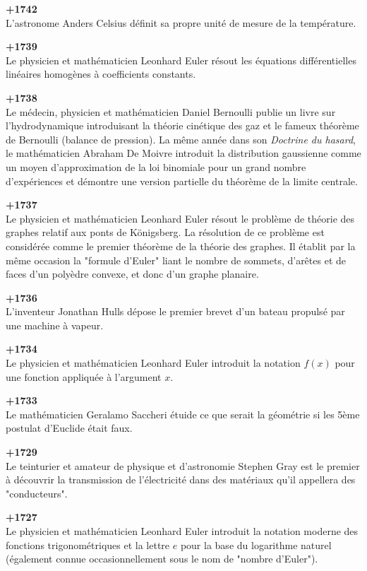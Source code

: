 \textbf{+1742}\\
L'astronome Anders Celsius définit sa propre unité de mesure de la température.

\textbf{+1739}\\
Le physicien et mathématicien Leonhard Euler résout les équations différentielles linéaires homogènes à coefficients constants.

\textbf{+1738}\\
Le médecin, physicien et mathématicien Daniel Bernoulli publie un livre sur l'hydrodynamique introduisant la théorie cinétique des gaz et le fameux théorème de Bernoulli (balance de pression). La même année dans son \textit{Doctrine du hasard}, le mathématicien Abraham De Moivre introduit la distribution gaussienne comme un moyen d'approximation de la loi binomiale pour un grand nombre d'expériences et démontre une version partielle du théorème de la limite centrale.

\textbf{+1737}\\
Le physicien et mathématicien Leonhard Euler résout le problème de théorie des graphes relatif aux ponts de Königsberg. La résolution de ce problème est considérée comme le premier théorème de la théorie des graphes. Il établit par la même occasion la "formule d'Euler" liant le nombre de sommets, d'arêtes et de faces d'un polyèdre convexe, et donc d'un graphe planaire.

\textbf{+1736}\\
L'inventeur Jonathan Hulls dépose le premier brevet d'un bateau propulsé par une machine à vapeur.

\textbf{+1734}\\
Le physicien et mathématicien Leonhard Euler introduit la notation $f(x)$ pour une fonction appliquée à l'argument $x$.

\textbf{+1733}\\
Le mathématicien Geralamo Saccheri étuide ce que serait la géométrie si les 5ème postulat d'Euclide était faux.

\textbf{+1729}\\
Le teinturier et amateur de physique et d'astronomie Stephen Gray est le premier à découvrir la transmission de l'électricité dans des matériaux qu'il appellera des "conducteurs".

\textbf{+1727}\\
Le physicien et mathématicien Leonhard Euler introduit la notation moderne des fonctions trigonométriques et la lettre $e$ pour la base du logarithme naturel (également connue occasionnellement sous le nom de "nombre d'Euler").

